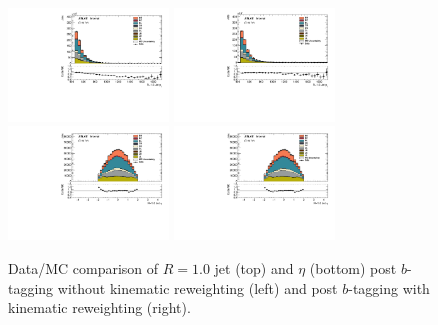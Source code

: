 \begin{figure}[htbp]
  \centering
 \includegraphics[width=0.38\textwidth]{figures/gbb/LargeRJet_pT_PreReweight.pdf}
 \includegraphics[width=0.38\textwidth]{figures/gbb/LargeRJet_pT_Reweight.pdf}
 \includegraphics[width=0.38\textwidth]{figures/gbb/LargeRJet_eta_PreReweight.pdf}
 \includegraphics[width=0.38\textwidth]{figures/gbb/LargeRJet_eta_Reweight.pdf}
\caption{Data/MC comparison of $R=1.0$ jet \pt (top) and $\eta$ (bottom) post $b$-tagging without kinematic reweighting (left) and post $b$-tagging with kinematic reweighting (right).}%
  \label{fig:gbb-pT_largeR}
\end{figure}


